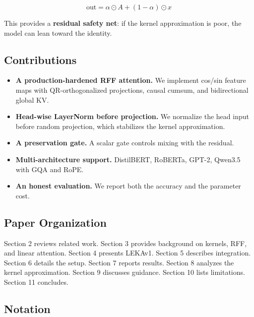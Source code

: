 \[
\text{out} = \alpha \odot A + (1 - \alpha) \odot x
\tag{1.8}
\]

This provides a \textbf{residual safety net}: if the kernel approximation is 
poor, the model can lean toward the identity.

\subsection{Contributions}

\begin{itemize}
\item \textbf{A production-hardened RFF attention.} We implement cos/sin feature
  maps with QR-orthogonalized projections, causal cumsum, and
  bidirectional global KV.
\item \textbf{Head-wise LayerNorm before projection.} We normalize the head input
  before random projection, which stabilizes the kernel approximation.
\item \textbf{A preservation gate.} A scalar gate controls mixing with the residual.
\item \textbf{Multi-architecture support.} DistilBERT, RoBERTa, GPT-2, Qwen3.5
  with GQA and RoPE.
\item \textbf{An honest evaluation.} We report both the accuracy and the parameter
  cost.

\end{itemize}
\subsection{Paper Organization}

Section 2 reviews related work. Section 3 provides background on kernels, 
RFF, and linear attention. Section 4 presents LEKAv1. Section 5 describes 
integration. Section 6 details the setup. Section 7 reports results. 
Section 8 analyzes the kernel approximation. Section 9 discusses guidance. 
Section 10 lists limitations. Section 11 concludes.



\subsection{Notation}

